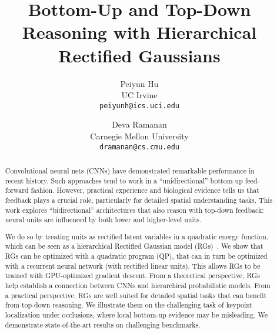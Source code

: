 \documentclass[10pt,twocolumn,letterpaper]{article}
\begin{document}
\title{Bottom-Up and Top-Down Reasoning with Hierarchical Rectified Gaussians}

\author{Peiyun Hu\\
UC Irvine\\
{\tt\small peiyunh@ics.uci.edu}
\and
Deva Ramanan\\
Carnegie Mellon University\\
{\tt\small dramanan@cs.cmu.edu}
}

\maketitle


\begin{abstract}
  Convolutional neural nets (CNNs) have demonstrated remarkable
  performance in recent history. Such approaches tend to work in a
  ``unidirectional'' bottom-up feed-forward fashion. However,
  practical experience and biological evidence tells us that feedback plays a crucial role,
  particularly for detailed spatial understanding tasks. This work
  explores ``bidirectional'' architectures that also reason with
  top-down feedback: neural units are influenced by both lower and
  higher-level units.

  We do so by treating units as rectified latent variables in a
  quadratic energy function, which can be seen as a hierarchical
  Rectified Gaussian model (RGs)~\cite{socci1998rectified}. We show
  that RGs can be optimized with a quadratic program (QP), that can in
  turn be optimized with a recurrent neural network (with rectified
  linear units). This allows RGs to be trained with GPU-optimized
  gradient descent. From a theoretical perspective, RGs help establish
  a connection between CNNs and hierarchical probabilistic
  models. From a practical perspective, RGs are well suited for
  detailed spatial tasks that can benefit from top-down reasoning. We
  illustrate them on the challenging task of keypoint localization
  under occlusions, where local bottom-up evidence may be
  misleading. We demonstrate state-of-the-art results on challenging
  benchmarks.

\end{abstract}
\end{document}
